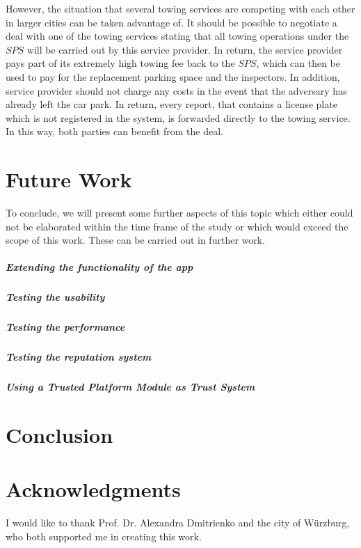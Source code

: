 \documentclass[
a4paper,     %
titlepage,   %
14pt         %
]{scrartcl}  %
\theoremstyle{mystyle}
\begin{document}
However, the situation that several towing services are competing with each other in larger cities can be taken advantage of. It should be possible to negotiate a deal with one of the towing services stating that all towing operations under the $SPS$ will be carried out by this service provider. In return, the service provider pays part of its extremely high towing fee back to the $SPS$, which can then be used to pay for the replacement parking space and the inspectors. In addition, service provider should not charge any costs in the event that the adversary has already left the car park. In return, every report, that contains a license plate which is not registered in the system, is forwarded directly to the towing service. In this way, both parties can benefit from the deal.


\section{Future Work}
To conclude, we will present some further aspects of this topic which either could not be elaborated within the time frame of the study or which would exceed the scope of this work. These can be carried out in further work.

\subparagraph{Extending the functionality of the app}
\subparagraph{Testing the usability}
\subparagraph{Testing the performance}
\subparagraph{Testing the reputation system}
\subparagraph{Using a Trusted Platform Module as Trust System}

\section{Conclusion}

\section{Acknowledgments}
I would like to thank Prof. Dr. Alexandra Dmitrienko and the city of Würzburg, who both supported me in creating this work.




















\end{document}
